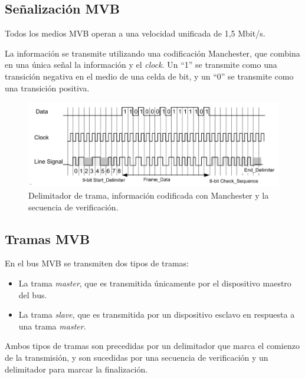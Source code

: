 \subsection{Señalización MVB}

Todos los medios MVB operan a una velocidad unificada de 1,5 Mbit/s.

La información se transmite utilizando una codificación Manchester, que combina en una única señal la información y el \textit{clock}. Un ``1'' se transmite como una transición negativa en el medio de una celda de bit, y un ``0'' se transmite como una transición positiva.

\begin{figure}[htbp]
	\centering
	\includegraphics[width=1\textwidth]{./Figures/manchester.png}
	\caption[Delimitador de trama, información codificada con Manchester y la secuencia de verificación]{Delimitador de trama, información codificada con Manchester y la secuencia de verificación.
        \\ }
\end{figure}

\subsection{Tramas MVB}

En el bus MVB se transmiten dos tipos de tramas:

\begin{itemize}
\item La trama \textit{master}, que es transmitida únicamente por el dispositivo maestro del bus.
\item La trama \textit{slave}, que es transmitida por un dispositivo esclavo en respuesta a una trama \textit{master}.
\end{itemize}

Ambos tipos de tramas son precedidas por un delimitador que marca el comienzo de la transmisión, y son sucedidas por una secuencia de verificación y un delimitador para marcar la finalización.

